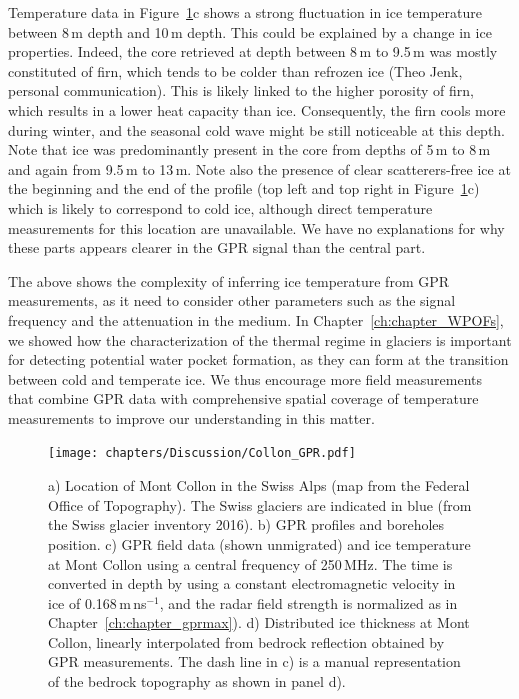 Temperature data in Figure~\ref{fig:collon_GPR}c shows a strong fluctuation in ice temperature between 8\,m depth and 10\,m depth. This could be explained by a change in ice properties. Indeed, the core retrieved at depth between 8\,m to 9.5\,m was mostly constituted of firn, which tends to be colder than refrozen ice (Theo Jenk, personal communication). This is likely linked to the higher porosity of firn, which results in a lower heat capacity than ice. Consequently, the firn cools more during winter, and the seasonal cold wave might be still noticeable at this depth. Note that ice was predominantly present in the core from depths of 5\,m to 8\,m and again from 9.5\,m to 13\,m. Note also the presence of clear scatterers-free ice at the beginning and the end of the profile (top left and top right in Figure~\ref{fig:collon_GPR}c) which is likely to correspond to cold ice, although direct temperature measurements for this location are unavailable. We have no explanations for why these parts appears clearer in the GPR signal than the central part. 
%

The above shows the complexity of inferring ice temperature from GPR measurements, as it need to consider other parameters such as the signal frequency and the attenuation in the medium. In Chapter~\ref{ch:chapter_WPOFs}, we showed how the characterization of the thermal regime in glaciers is important for detecting potential water pocket formation, as they can form at the transition between cold and temperate ice. We thus encourage more field measurements that combine GPR data with comprehensive spatial coverage of temperature measurements to improve our understanding in this matter.


\begin{figure}[H]
    \centering
    \texttt{[image: chapters/Discussion/Collon\_GPR.pdf]}
    \caption{a) Location of Mont Collon in the Swiss Alps (map from the Federal Office of Topography). The Swiss glaciers are indicated in blue (from the Swiss glacier inventory 2016). b) GPR profiles and boreholes position. c) GPR field data (shown unmigrated) and ice temperature at Mont Collon using a central frequency of 250\,MHz. The time is converted in depth by using a constant electromagnetic velocity in ice of 0.168\,m\,ns$^{-1}$, and the radar field strength is normalized as in Chapter~\ref{ch:chapter_gprmax}). d) Distributed ice thickness at Mont Collon, linearly interpolated from bedrock reflection obtained by GPR measurements. The dash line in c) is a manual representation of the bedrock topography as shown in panel d).}
    \label{fig:collon_GPR}
\end{figure}




